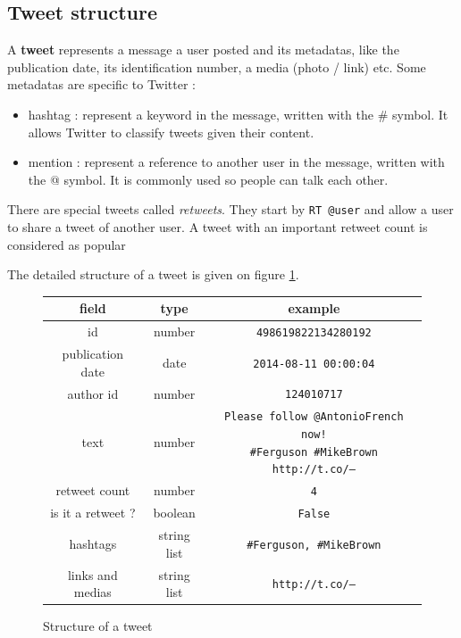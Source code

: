 \documentclass[a4paper,twoside,12pt,openright]{report}
\begin{document}
\subsection{Tweet structure}
A \textbf{tweet} represents a message a user posted and its metadatas, like the publication date, its identification number, a media (photo / link) etc. Some metadatas are specific to Twitter : 
\begin{itemize}
\item hashtag : represent a keyword in the message, written with the \# symbol. It allows Twitter to classify tweets given their content.
\item mention : represent a reference to another user in the message, written with the @ symbol. It is commonly used so people can talk each other.
\end{itemize}
There are special tweets called \emph{retweets}. They start by \texttt{RT @user} and allow a user to share a tweet of another user. A tweet with an important retweet count is considered as popular

The detailed structure of a tweet is given on figure \ref{structTweet}.

\begin{figure}[h!]
\centering
\begin{tabular}{ccc}
field & type & example\\
\hline
\hline
id & number & \texttt{498619822134280192} \\ \hline
publication date & date & \texttt{2014-08-11 00:00:04} \\ \hline
author id & number & \texttt{124010717} \\ \hline
text & number & \pbox{9cm}{\vspace*{5pt}\texttt{Please follow @AntonioFrench now! \newline \#Ferguson \#MikeBrown http://t.co/---}\vspace*{5pt}} \\ \hline
retweet count & number & \texttt{4} \\ \hline
is it a retweet ? & boolean & \texttt{False} \\ \hline
hashtags & string list & \texttt{\#Ferguson, \#MikeBrown} \\ \hline
links and medias & string list & \texttt{http://t.co/---} \\ \hline \hline
\end{tabular}
\caption{Structure of a tweet}
\label{structTweet}
\end{figure}
\end{document}
